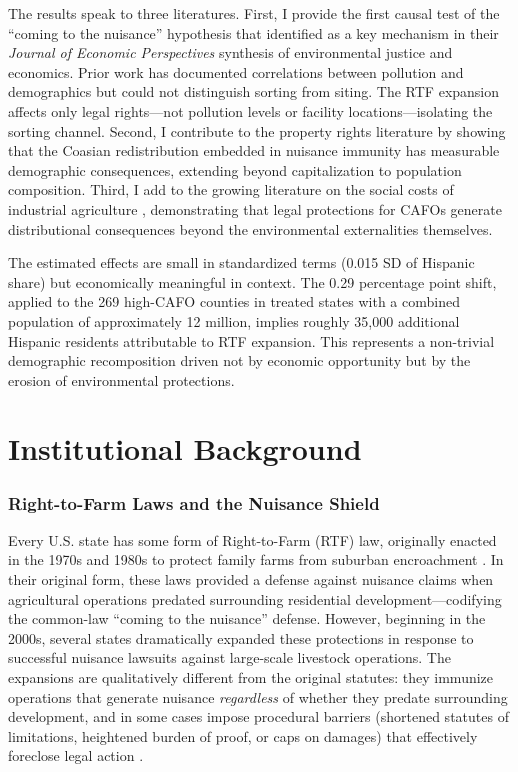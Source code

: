 \documentclass[12pt]{article}
\begin{document}
The results speak to three literatures. First, I provide the first causal test of the ``coming to the nuisance'' hypothesis that \citet{banzhaf2019environmental} identified as a key mechanism in their \textit{Journal of Economic Perspectives} synthesis of environmental justice and economics. Prior work has documented correlations between pollution and demographics \citep{been1994locally, pastor2001environmental, mohai2009environmental} but could not distinguish sorting from siting. The RTF expansion affects only legal rights---not pollution levels or facility locations---isolating the sorting channel. Second, I contribute to the property rights literature by showing that the Coasian redistribution embedded in nuisance immunity has measurable demographic consequences, extending \citet{greenstone2005impact} beyond capitalization to population composition. Third, I add to the growing literature on the social costs of industrial agriculture \citep{osterberg2006community, sneeringer2009does, ihle2022industrial}, demonstrating that legal protections for CAFOs generate distributional consequences beyond the environmental externalities themselves.

The estimated effects are small in standardized terms (0.015 SD of Hispanic share) but economically meaningful in context. The 0.29 percentage point shift, applied to the 269 high-CAFO counties in treated states with a combined population of approximately 12 million, implies roughly 35,000 additional Hispanic residents attributable to RTF expansion. This represents a non-trivial demographic recomposition driven not by economic opportunity but by the erosion of environmental protections.

\section{Institutional Background}

\subsubsection*{Right-to-Farm Laws and the Nuisance Shield} Every U.S. state has some form of Right-to-Farm (RTF) law, originally enacted in the 1970s and 1980s to protect family farms from suburban encroachment \citep{centner2006antinutrition}. In their original form, these laws provided a defense against nuisance claims when agricultural operations predated surrounding residential development---codifying the common-law ``coming to the nuisance'' defense. However, beginning in the 2000s, several states dramatically expanded these protections in response to successful nuisance lawsuits against large-scale livestock operations. The expansions are qualitatively different from the original statutes: they immunize operations that generate nuisance \textit{regardless} of whether they predate surrounding development, and in some cases impose procedural barriers (shortened statutes of limitations, heightened burden of proof, or caps on damages) that effectively foreclose legal action \citep{gibbons2019agricultural}.
\end{document}
